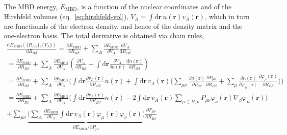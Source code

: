 The MBD energy, $E_\text{MBD}$, is a function of the nuclear coordinates and of the Hirshfeld volumes (eq.~\ref{eq:hirshfeld-vol}), $V_A=\int\mathrm d\mathbf r\,n(\mathbf r)v_A(\mathbf r)$, which in turn are functionals of the electron density, and hence of the density matrix and the one-electron basis.
The total derivative is obtained via chain rules,
\begin{multline}
\frac{\mathrm dE_\text{MBD}(\{R_{A\alpha}\},\{V_A\})}{\mathrm dR_{B\beta}}=\frac{\partial E_\text{MBD}}{\partial R_{B\beta}}+\sum_A\frac{\partial E_\text{MBD}}{\partial V_A}\frac{\mathrm dV_A}{\mathrm dR_{B\beta}} \\
=\frac{\partial E_\text{MBD}}{\partial R_{B\beta}}+\sum_A\frac{\partial E_\text{MBD}}{\partial V_A}\left(\frac{\partial V_A}{\partial R_{B\beta}}+\int\mathrm d\mathbf r\frac{\delta V_A}{\delta n(\mathbf r)}\frac{\mathrm dn(\mathbf r)}{\mathrm dR_{B\beta}}\right) \\
=\frac{\partial E_\text{MBD}}{\partial R_{B\beta}}+\sum_A\frac{\partial E_\text{MBD}}{\partial V_A}\Bigg(\int\mathrm d\mathbf r\frac{\partial v_A(\mathbf r)}{\partial R_{B\beta}}n(\mathbf r)+\int\mathrm d\mathbf r\,v_A(\mathbf r)\Big(\sum_{\mu\nu}\frac{\partial n(\mathbf r)}{\partial P_{\mu\nu}}\frac{\partial P_{\mu\nu}}{\partial R_{B\beta}}+\sum_\mu\frac{\partial n(\mathbf r)}{\partial\varphi_\mu(\mathbf r)}\frac{\partial\varphi_\mu(\mathbf r)}{\partial R_{B\beta}}\Big)\!\Bigg) \\
=\frac{\partial E_\text{MBD}}{\partial R_{B\beta}}+\sum_A\frac{\partial E_\text{MBD}}{\partial V_A}\Bigg(\int\mathrm d\mathbf r\frac{\partial v_A(\mathbf r)}{\partial R_{B\beta}}n(\mathbf r)-2\int\mathrm d\mathbf r\,v_A(\mathbf r)\sum_{\mu\in B,\nu} P_{\mu\nu}\varphi_\nu(\mathbf r)\nabla_\beta\varphi_\mu(\mathbf r)\Bigg) \\
+\sum_{\mu\nu}\underbrace{\Bigg(\sum_A\frac{\partial E_\text{MBD}}{\partial V_A}\int\mathrm d\mathbf r\,v_A(\mathbf r)\varphi_\mu(\mathbf r)\varphi_\nu(\mathbf r)\!\Bigg)}_{\partial E_\text{MBD}/\partial P_{\mu\nu}}\frac{\partial P_{\mu\nu}}{\partial R_{B\beta}}
\end{multline}

